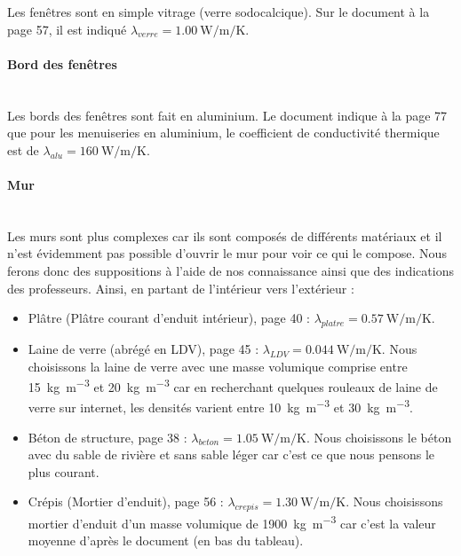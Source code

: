 \documentclass[12pt, a4paper]{article}
\newcommand{\lambdaAlu}{\ensuremath{\lambda_{alu}}}
\newcommand{\lambdaVerre}{\ensuremath{\lambda_{verre}}}
\newcommand{\lambdaPlatre}{\ensuremath{\lambda_{platre}}}
\newcommand{\lambdaLDV}{\ensuremath{\lambda_{LDV}}}
\newcommand{\lambdaBeton}{\ensuremath{\lambda_{beton}}}
\newcommand{\lambdaCrepis}{\ensuremath{\lambda_{crepis}}}
\begin{document}
Les fenêtres sont en simple vitrage (verre sodocalcique). Sur le document à la page 57, il est indiqué $\boxed{\lambdaVerre = \SI{1.00}{\watt\per\meter\per\kelvin}}$.

\paragraph{Bord des fenêtres} \phantom{.} \\

Les bords des fenêtres sont fait en aluminium. Le document indique à la page 77 que pour les menuiseries en aluminium, le coefficient de conductivité thermique est de $\boxed{\lambdaAlu = \SI{160}{\watt\per\meter\per\kelvin}}$.

\paragraph{Mur} \phantom{.} \\

Les murs sont plus complexes car ils sont composés de différents matériaux et il n'est évidemment pas possible d'ouvrir le mur pour voir ce qui le compose. Nous ferons donc des suppositions à l'aide de nos connaissance ainsi que des indications des professeurs. Ainsi, en partant de l'intérieur vers l'extérieur :

\begin{itemize}
\item Plâtre (Plâtre courant d’enduit intérieur), page 40 : $\boxed{\lambdaPlatre = \SI{0.57}{\watt\per\meter\per\kelvin}}$.
\item Laine de verre (abrégé en LDV), page 45 : $\boxed{\lambdaLDV = \SI{0.044}{\watt\per\meter\per\kelvin}}$. Nous choisissons la laine de verre avec une masse volumique comprise entre \SI{15}{\kilo\gram\per\meter\cubed} et \SI{20}{\kilo\gram\per\meter\cubed} car en recherchant quelques rouleaux de laine de verre sur internet,  les densités varient entre \SI{10}{\kilo\gram\per\meter\cubed} et \SI{30}{\kilo\gram\per\meter\cubed}.
\item Béton de structure, page 38 : $\boxed{\lambdaBeton = \SI{1.05}{\watt\per\meter\per\kelvin}}$. Nous choisissons le béton avec du sable de rivière et sans sable léger car c'est ce que nous pensons le plus courant.
\item Crépis (Mortier d'enduit), page 56 : $\boxed{\lambdaCrepis = \SI{1.30}{\watt\per\meter\per\kelvin}}$. Nous choisissons mortier d'enduit d'un masse volumique de \SI{1900}{\kilo\gram\per\meter\cubed} car c'est la valeur moyenne d'après le document (en bas du tableau).
\end{itemize}
\end{document}

